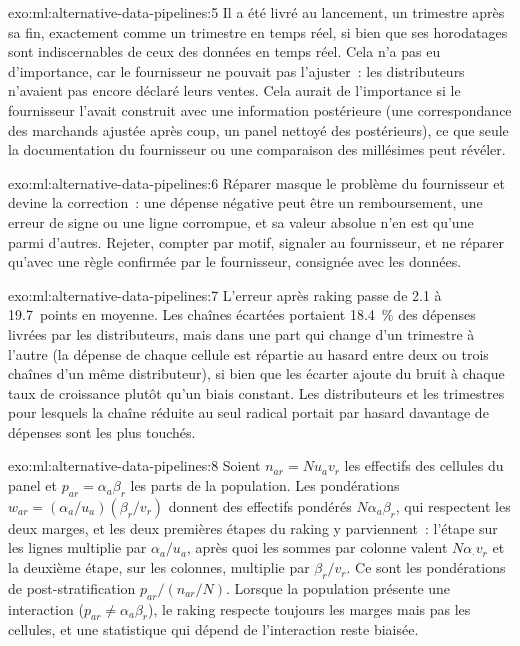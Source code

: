 \begin{solution}{exo:ml:alternative-data-pipelines:5}
Il a été livré au lancement, un trimestre après sa fin, exactement comme un trimestre en temps réel, si bien que ses horodatages sont indiscernables
de ceux des données en temps réel. Cela n'a pas eu d'importance, car le fournisseur ne pouvait pas l'ajuster~: les distributeurs n'avaient pas encore déclaré leurs ventes. Cela aurait
de l'importance si le fournisseur l'avait construit avec une information postérieure (une correspondance des marchands ajustée après coup, un panel nettoyé des
 postérieurs), ce que seule la documentation du fournisseur ou une comparaison des millésimes peut révéler.
\end{solution}

\begin{solution}{exo:ml:alternative-data-pipelines:6}
Réparer masque le problème du fournisseur et devine la correction~: une dépense négative peut être un remboursement, une erreur de signe ou une
ligne corrompue, et sa valeur absolue n'en est qu'une parmi d'autres. Rejeter, compter par motif, signaler au fournisseur, et ne réparer qu'avec une règle
confirmée par le fournisseur, consignée avec les données.
\end{solution}

\begin{solution}{exo:ml:alternative-data-pipelines:7}
L'erreur après raking passe de 2.1 à 19.7~points en moyenne. Les chaînes écartées portaient 18.4~\% des dépenses livrées
par les distributeurs, mais dans une part qui change d'un trimestre à l'autre (la dépense de chaque cellule est répartie au hasard entre deux ou trois
chaînes d'un même distributeur), si bien que les écarter ajoute du bruit à chaque taux de croissance plutôt qu'un biais constant. Les distributeurs et les trimestres
pour lesquels la chaîne réduite au seul radical portait par hasard davantage de dépenses sont les plus touchés.
\end{solution}

\begin{solution}{exo:ml:alternative-data-pipelines:8}
Soient $n_{ar} = N u_a v_r$ les effectifs des cellules du panel et $p_{ar} = \alpha_a\beta_r$ les parts de la population. Les pondérations
$w_{ar} = (\alpha_a/u_a)(\beta_r/v_r)$ donnent des effectifs pondérés $N\alpha_a\beta_r$, qui respectent les deux marges, et les deux premières étapes du raking y parviennent~:
l'étape sur les lignes multiplie par $\alpha_a/u_a$, après quoi les sommes par colonne valent $N\alpha_\cdot v_r$ et la
deuxième étape, sur les colonnes, multiplie par $\beta_r/v_r$. Ce sont les pondérations de post-stratification $p_{ar}/(n_{ar}/N)$. Lorsque la population
présente une interaction ($p_{ar}\ne\alpha_a\beta_r$), le raking respecte toujours les marges mais pas les cellules, et une statistique qui
dépend de l'interaction reste biaisée.
\end{solution}

